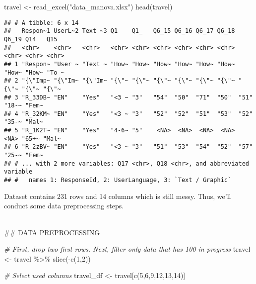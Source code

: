 \documentclass[
]{article}
\newenvironment{Shaded}{\begin{snugshade}}{\end{snugshade}}
\newcommand{\CommentTok}[1]{\textcolor[rgb]{0.56,0.35,0.01}{\textit{#1}}}
\newcommand{\DecValTok}[1]{\textcolor[rgb]{0.00,0.00,0.81}{#1}}
\newcommand{\FunctionTok}[1]{\textcolor[rgb]{0.00,0.00,0.00}{#1}}
\newcommand{\NormalTok}[1]{#1}
\newcommand{\OtherTok}[1]{\textcolor[rgb]{0.56,0.35,0.01}{#1}}
\newcommand{\SpecialCharTok}[1]{\textcolor[rgb]{0.00,0.00,0.00}{#1}}
\newcommand{\StringTok}[1]{\textcolor[rgb]{0.31,0.60,0.02}{#1}}
\begin{document}
\begin{Shaded}
\begin{Highlighting}[]
\NormalTok{travel }\OtherTok{\textless{}{-}} \FunctionTok{read\_excel}\NormalTok{(}\StringTok{"data\_manova.xlsx"}\NormalTok{)}
\FunctionTok{head}\NormalTok{(travel)}
\end{Highlighting}
\end{Shaded}

\begin{verbatim}
## # A tibble: 6 x 14
##   Respon~1 UserL~2 Text ~3 Q1    Q1_   Q6_15 Q6_16 Q6_17 Q6_18 Q6_19 Q14   Q15  
##   <chr>    <chr>   <chr>   <chr> <chr> <chr> <chr> <chr> <chr> <chr> <chr> <chr>
## 1 "Respon~ "User ~ "Text ~ "How~ "How~ "How~ "How~ "How~ "How~ "How~ "How~ "To ~
## 2 "{\"Imp~ "{\"Im~ "{\"Im~ "{\"~ "{\"~ "{\"~ "{\"~ "{\"~ "{\"~ "{\"~ "{\"~ "{\"~
## 3 "R_33DB~ "EN"    "Yes"   "<3 ~ "3"   "54"  "50"  "71"  "50"  "51"  "18-~ "Fem~
## 4 "R_32KM~ "EN"    "Yes"   "<3 ~ "3"   "52"  "52"  "51"  "53"  "52"  "35-~ "Mal~
## 5 "R_1K2T~ "EN"    "Yes"   "4-6~ "5"    <NA>  <NA>  <NA>  <NA>  <NA> "65+~ "Mal~
## 6 "R_2zBV~ "EN"    "Yes"   "<3 ~ "3"   "51"  "53"  "54"  "52"  "57"  "25-~ "Fem~
## # ... with 2 more variables: Q17 <chr>, Q18 <chr>, and abbreviated variable
## #   names 1: ResponseId, 2: UserLanguage, 3: `Text / Graphic`
\end{verbatim}

Dataset contains 231 rows and 14 columns which is still messy. Thus,
we'll conduct some data preprocessing steps.\\
\strut \\
\#\# DATA PREPROCESSING

\begin{Shaded}
\begin{Highlighting}[]
\CommentTok{\# First, drop two first rows. Next, filter only data that has 100 in progress}
\NormalTok{travel }\OtherTok{\textless{}{-}}\NormalTok{ travel }\SpecialCharTok{\%\textgreater{}\%} 
  \FunctionTok{slice}\NormalTok{(}\SpecialCharTok{{-}}\FunctionTok{c}\NormalTok{(}\DecValTok{1}\NormalTok{,}\DecValTok{2}\NormalTok{))}

\CommentTok{\# Select used columns}
\NormalTok{travel\_df }\OtherTok{\textless{}{-}}\NormalTok{ travel[}\FunctionTok{c}\NormalTok{(}\DecValTok{5}\NormalTok{,}\DecValTok{6}\NormalTok{,}\DecValTok{9}\NormalTok{,}\DecValTok{12}\NormalTok{,}\DecValTok{13}\NormalTok{,}\DecValTok{14}\NormalTok{)]}
\end{Highlighting}
\end{Shaded}
\end{document}
